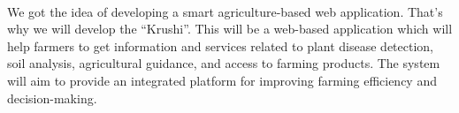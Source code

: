 \paragraph{}We got the idea of developing a smart agriculture-based web application. That’s why we will develop the “Krushi”. This will be a web-based application which will help farmers to get information and services related to plant disease detection, soil analysis, agricultural guidance, and access to farming products. The system will aim to provide an integrated platform for improving farming efficiency and decision-making.\